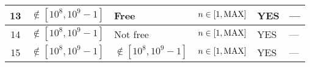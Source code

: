 \begin{itemize}
\begin{table}[!hbtp]
\begin{tabular}{|c|l|l|l|l|l|}
      13 & $\notin [10^8,10^9-1]$ & Free & $n \in [1,\rm{MAX}]$
         & YES & --- \\ \hline
      14 & $\notin [10^8,10^9-1]$ & Not free & $n \in [1,\rm{MAX}]$
         & YES & --- \\ \hline
      15 & $\notin [10^8,10^9-1]$ & $\notin [10^8,10^9-1]$& $n \in [1,\rm{MAX}]$
         & YES & --- \\ \hline

    \end{tabular}
  \end{table}
\end{itemize}